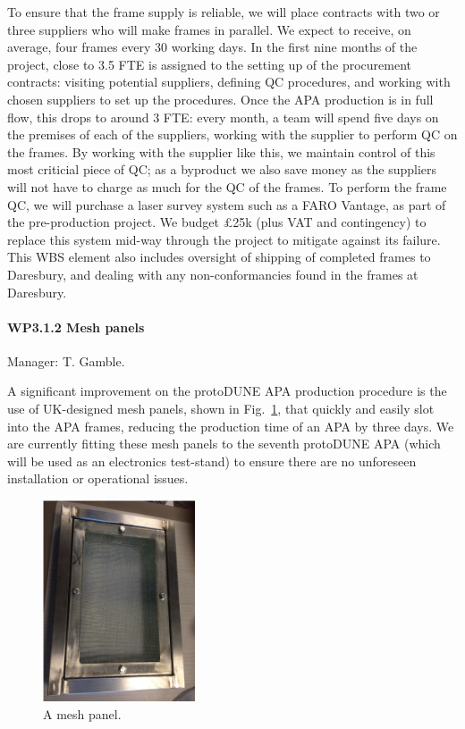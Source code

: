 To ensure that the frame supply is reliable, we will place contracts with two or three suppliers who will make frames in parallel. We expect to receive, on average, four frames every 30 working days.
In the first nine months of the project, close to 3.5 FTE is assigned to the setting up of the procurement contracts: visiting potential suppliers, defining QC procedures, and working with chosen suppliers to set up the procedures. Once the APA production is in full flow, this drops to around 3 FTE: every month, a team will spend five days on the premises of each of the suppliers, working with the supplier to perform QC on the frames. By working with the supplier like this, we maintain control of this most criticial piece of QC; as a byproduct we also save money as the suppliers will not have to charge as much for the QC of the frames. To perform the frame QC, we will purchase a laser survey system such as a FARO Vantage, as part of the pre-production project. We budget £25k (plus VAT and contingency) to replace this system mid-way through the project to mitigate against its failure. This WBS element also includes oversight of shipping of completed frames to Daresbury, and dealing with any non-conformancies found in the frames at Daresbury.

\paragraph{WP3.1.2 Mesh panels} Manager: T. Gamble.

A significant improvement on the protoDUNE APA production procedure is the use of UK-designed mesh panels, shown in Fig.~\ref{fig:MeshPanel}, that quickly and easily slot into the APA frames, reducing the production time of an APA by three days. We are currently fitting these mesh panels to the seventh protoDUNE APA (which will be used as an electronics test-stand) to ensure there are no unforeseen installation or operational issues.

\begin{figure}
    \centering
    \includegraphics[width=0.4\textwidth]{figs/WP3/MeshPanel.png}
    \caption{A mesh panel.}
    \label{fig:MeshPanel}
\end{figure}


